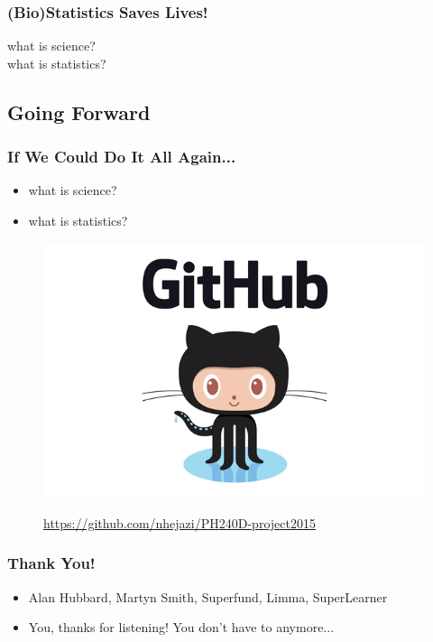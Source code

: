 \documentclass{beamer}
\begin{document}
\begin{frame}[fragile]
  	\frametitle{(Bio)Statistics Saves Lives!}
 		what is science? \\
		what is statistics?
\end{frame}

\subsection{Going Forward}

\begin{frame}[fragile]
  	\frametitle{If We Could Do It All Again...}
		\begin{itemize}
			\item what is science?
			\item what is statistics?
		\end{itemize}
  		\begin{figure}
   			\href{https://github.com/nhejazi/PH240D-project2015}
         			{\includegraphics[scale=0.25]{../paper/figs/octocat.png}}
			\caption{\url{https://github.com/nhejazi/PH240D-project2015}}
      		\end{figure}
\end{frame}

\begin{frame}[fragile]
  	\frametitle{Thank You!}
		\begin{itemize}
			\item {Alan Hubbard, Martyn Smith, Superfund, Limma, SuperLearner}
			\item {You, thanks for listening! You don't have to anymore...}
		\end{itemize}
\end{frame}
\end{document}
